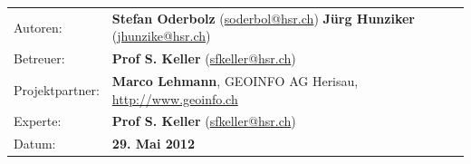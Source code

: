 \begin{titlepage}
\begin{flushleft}
\begin{tabular}{lp{12cm}}
Autoren: & \textbf{Stefan Oderbolz} (\url{soderbol@hsr.ch}) \newline
 \textbf{Jürg Hunziker} (\url{jhunzike@hsr.ch}) \\ 
Betreuer: & \textbf{Prof S. Keller} (\url{sfkeller@hsr.ch}) \\ 
Projektpartner: & \textbf{Marco Lehmann}, GEOINFO AG Herisau, \url{http://www.geoinfo.ch} \\ 
Experte: & \textbf{Prof S. Keller} (\url{sfkeller@hsr.ch}) \\ 
Datum: & \textbf{29. Mai 2012} \\ 
\end{tabular}

\end{flushleft}
\end{titlepage}
